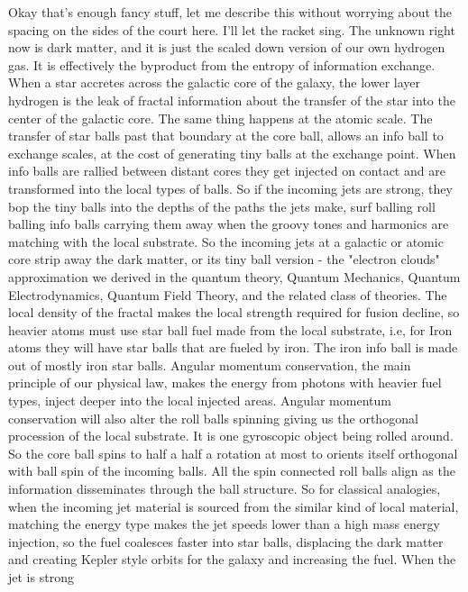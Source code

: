 \documentclass[11pt,a4paper]{article}
\begin{document}
Okay that's enough fancy stuff, let me describe this without worrying
about the spacing on the sides of the court here. I'll let the racket
sing. The unknown right now is dark matter, and it is just the scaled
down version of our own hydrogen gas. It is effectively the byproduct 
from the entropy of information exchange. When a star accretes across
the galactic core of the galaxy, the lower layer hydrogen is the leak
of fractal information about the transfer of the star into the center
of the galactic core. The same thing happens at the atomic scale. The
transfer of star balls past that boundary at the core ball, allows an
info ball to exchange scales, at the cost of generating tiny balls at
the exchange point. When info balls are rallied between distant cores
they get injected on contact and are transformed into the local types
of balls. So if the incoming jets are strong, they bop the tiny balls
into the depths of the paths the jets make, surf balling roll balling
info balls carrying them away when the groovy tones and harmonics are
matching with the local substrate. So the incoming jets at a galactic        
or atomic core strip away the dark matter, or its tiny ball version -
the "electron clouds" approximation we derived in the quantum theory,
Quantum Mechanics, Quantum Electrodynamics, Quantum Field Theory, and
the related class of theories. The local density of the fractal makes
the local strength required for fusion decline, so heavier atoms must
use star ball fuel made from the local substrate, i.e, for Iron atoms  
they will have star balls that are fueled by iron. The iron info ball
is made out of mostly iron star balls. Angular momentum conservation,
the main principle of our physical law, makes the energy from photons
with heavier fuel types, inject deeper into the local injected areas.
Angular momentum conservation will also alter the roll balls spinning 
giving us the orthogonal procession of the local substrate. It is one
gyroscopic object being rolled around. So the core ball spins to half
a half a rotation at most to orients itself orthogonal with ball spin
of the incoming balls. All the spin connected roll balls align as the
information disseminates through the ball structure. So for classical 
analogies, when the incoming jet material is sourced from the similar
kind of local material, matching the energy type makes the jet speeds
lower than a high mass energy injection, so the fuel coalesces faster
into star balls, displacing the dark matter and creating Kepler style
orbits for the galaxy and increasing the fuel. When the jet is strong
\end{document}
